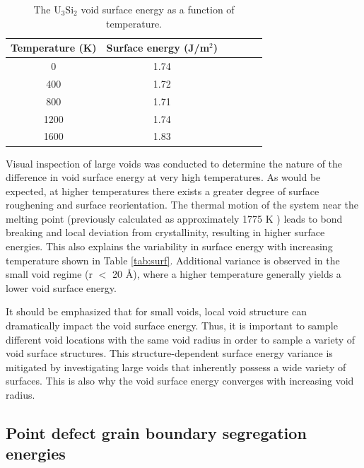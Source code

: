 \documentclass[review]{elsarticle}
\begin{document}
\begin{table}[h]
\caption{The U$_{3}$Si$_{2}$ void surface energy as a function of temperature.} \label{tab:void}
\begin{center}
\begin{tabular}{|c|c|c|c|c|c|}
	\hline
	Temperature (K) & Surface energy (J/m$^{2}$)\\
	 \hline
	 0 & 1.74	 \\
	 400 & 1.72 \\
	 800 & 1.71	 \\
	 1200 & 1.74 \\
	 1600 & 1.83 \\
	 \hline
\end{tabular}
\end{center}
\label{default}
\end{table}

Visual inspection of large voids was conducted to determine the nature of the difference in void surface energy at very high temperatures. As would be expected, at higher temperatures there exists a greater degree of surface roughening and surface reorientation. The thermal motion of the system near the melting point (previously calculated as approximately 1775 K \cite{beelerUSi}) leads to bond breaking and local deviation from crystallinity, resulting in higher surface energies. This also explains the variability in surface energy with increasing temperature shown in Table \ref{tab:surf}. Additional variance is observed in the small void regime (r $<$ 20 {\AA}), where a higher temperature generally yields a lower void surface energy. 

It should be emphasized that for small voids, local void structure can dramatically impact the void surface energy. Thus, it is important to sample different void locations with the same void radius in order to sample a variety of void surface structures. This structure-dependent surface energy variance is mitigated by investigating large voids that inherently possess a wide variety of surfaces. This is also why the void surface energy converges with increasing void radius. 

\FloatBarrier

\subsection{Point defect grain boundary segregation energies}
\end{document}
